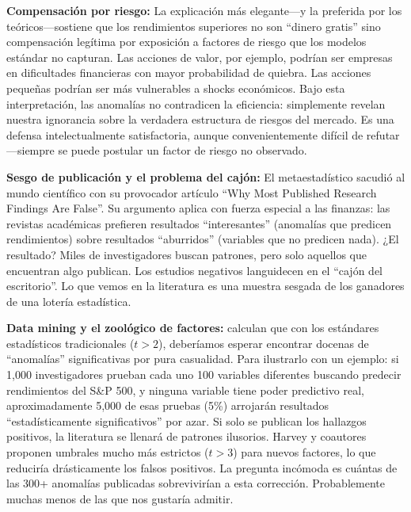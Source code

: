 \documentclass[11pt,a4paper]{article}
\begin{document}
\textbf{Compensación por riesgo:} La explicación más elegante---y la preferida por los teóricos---sostiene que los rendimientos superiores no son ``dinero gratis'' sino compensación legítima por exposición a factores de riesgo que los modelos estándar no capturan. Las acciones de valor, por ejemplo, podrían ser empresas en dificultades financieras con mayor probabilidad de quiebra. Las acciones pequeñas podrían ser más vulnerables a shocks económicos. Bajo esta interpretación, las anomalías no contradicen la eficiencia: simplemente revelan nuestra ignorancia sobre la verdadera estructura de riesgos del mercado. Es una defensa intelectualmente satisfactoria, aunque convenientemente difícil de refutar---siempre se puede postular un factor de riesgo no observado.

\textbf{Sesgo de publicación y el problema del cajón:} El metaestadístico \citet{ioannidis2005} sacudió al mundo científico con su provocador artículo ``Why Most Published Research Findings Are False''. Su argumento aplica con fuerza especial a las finanzas: las revistas académicas prefieren resultados ``interesantes'' (anomalías que predicen rendimientos) sobre resultados ``aburridos'' (variables que no predicen nada). ¿El resultado? Miles de investigadores buscan patrones, pero solo aquellos que encuentran algo publican. Los estudios negativos languidecen en el ``cajón del escritorio''. Lo que vemos en la literatura es una muestra sesgada de los ganadores de una lotería estadística.

\textbf{Data mining y el zoológico de factores:} \citet{harvey2016} calculan que con los estándares estadísticos tradicionales ($t > 2$), deberíamos esperar encontrar docenas de ``anomalías'' significativas por pura casualidad. Para ilustrarlo con un ejemplo: si 1,000 investigadores prueban cada uno 100 variables diferentes buscando predecir rendimientos del S\&P 500, y ninguna variable tiene poder predictivo real, aproximadamente 5,000 de esas pruebas (5\%) arrojarán resultados ``estadísticamente significativos'' por azar. Si solo se publican los hallazgos positivos, la literatura se llenará de patrones ilusorios. Harvey y coautores proponen umbrales mucho más estrictos ($t > 3$) para nuevos factores, lo que reduciría drásticamente los falsos positivos. La pregunta incómoda es cuántas de las 300+ anomalías publicadas sobrevivirían a esta corrección. Probablemente muchas menos de las que nos gustaría admitir.
\end{document}
